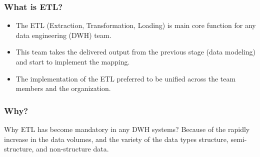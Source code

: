 \begin{frame}
	\frametitle{What is ETL?}
	
	\begin{itemize}[<+->]
		\item The ETL (Extraction, Transformation, Loading) is main core function for any data engineering (DWH) team.
		
		\item This team takes the delivered output from the previous stage (data modeling) and start to implement the mapping.
		
		\item The implementation of the ETL preferred to be unified across the team members and the organization.
		
	\end{itemize}
	
\end{frame}
\begin{frame}
    \frametitle{Why?}
\centering
\begin{block}{Why ETL has become mandatory in any DWH systems? }
Because of the rapidly increase in the data volumes,
and the variety of the data types structure, semi-structure, and non-structure data.
\end{block}

\end{frame}

